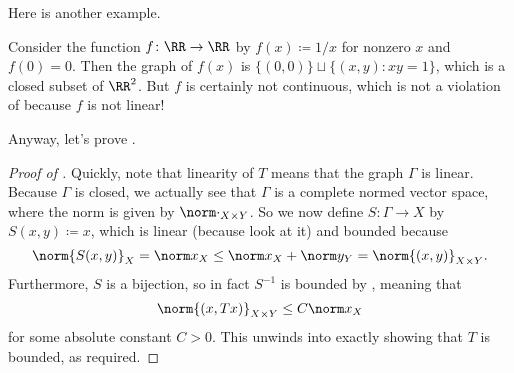 \documentclass[../notes.tex]{subfiles}
\begin{document}
Here is another example.
\begin{example}
	Consider the function $f\colon\RR\to\RR$ by $f(x)\coloneqq1/x$ for nonzero $x$ and $f(0)=0$. Then the graph of $f(x)$ is $\{(0,0)\}\sqcup\{(x,y):xy=1\}$, which is a closed subset of $\RR^2$. But $f$ is certainly not continuous, which is not a violation of  because $f$ is not linear!
\end{example}
Anyway, let's prove .
\begin{proof}[Proof of ]
	Quickly, note that linearity of $T$ means that the graph $\Gamma$ is linear. Because $\Gamma$ is closed, we actually see that $\Gamma$ is a complete normed vector space, where the norm is given by $\norm\cdot_{X\times Y}$. So we now define $S\colon\Gamma\to X$ by $S(x,y)\coloneqq x$, which is linear (because look at it) and bounded because
	\[\norm{S(x,y)}_X=\norm x_X\le\norm x_X+\norm y_Y=\norm{(x,y)}_{X\times Y}.\]
	Furthermore, $S$ is a bijection, so in fact $S^{-1}$ is bounded by , meaning that
	\[\norm{(x,Tx)}_{X\times Y}\le C\norm x_X\]
	for some absolute constant $C>0$. This unwinds into exactly showing that $T$ is bounded, as required.
\end{proof}
\end{document}
